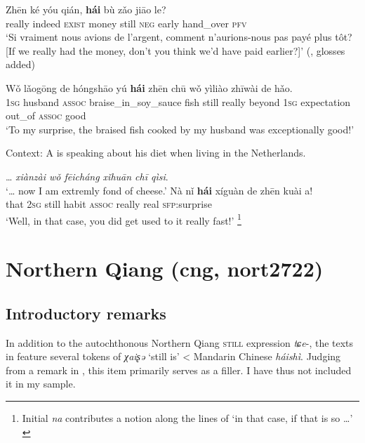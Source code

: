 \begin{exe}
	\ex\label{exAppendixMandarinCounterExpectation1}
		\gll Zhēn	ké	yóu	qián,	\textbf{hái}	bù	zǎo	jiāo	le?\\
	really indeed \textsc{exist} money still \textsc{neg} early hand\_over \textsc{pfv}\\
	\glt \lq Si vraiment nous avions de l'argent, comment n'aurions-nous pas payé plus tôt? [If we really had the money, don't you think we'd have paid earlier?]\rq{ }(\cite[16]{Alleton1972}, glosses added)

	\ex\label{exAppendixMandarinCounterExpectation3}
	\gll Wǒ	lǎogōng	de	hóngshāo	yú	\textbf{hái}	zhēn	chū	wǒ yìliào	zhīwài	de 	hǎo.\\
	1\textsc{sg} husband \textsc{assoc} braise\_in\_soy\_sauce fish still really beyond 1\textsc{sg} expectation out\_of \textsc{assoc} good\\
	\glt \lq To my surprise, the braised fish cooked by my husband was exceptionally good!' \parencite[345]{BiqHuang2016}

	\ex\label{exAppendixMandarinCounterExpectation5}
	Context: A is speaking about his diet when living in the Netherlands.\\
	\begin{xlist}
		… \textit{xiànzài wǒ fēicháng xǐhuān chī qìsi}.\\
		\lq … now I am extremly fond of cheese.'
		 \gll Nà nǐ \textbf{hái} xíguàn de zhēn kuài a!\\
		that 2\textsc{sg} still habit \textsc{assoc} really real \textsc{sfp}:surprise\\
		\glt \lq Well, in that case, you did get used to it really fast!\rq{ }\parencite[110]{Wiedenhof2015}\footnote{Initial \textit{na} contributes a notion along the lines of \lq in that case, if that is so …' \parencite[110]{Wiedenhof2015}}
	\end{xlist}
\end{exe}

\section{Northern Qiang (cng, nort2722)}
\label{appendixQiang}
\subsection{Introductory remarks}
In addition to the autochthonous Northern Qiang \textsc{still} expression \mbox{\textit{tɕe}-}, the texts in \textcite{LaPollaHuang2003} feature several tokens of \textit{χaiʂə} \lq still is' < Mandarin Chinese \textit{háishì}. Judging from a remark in \textcite[222]{LaPollaHuang2003}, this item primarily serves as a filler. I have thus not included it in my sample.

